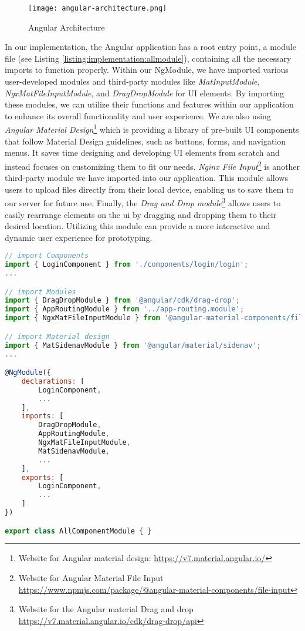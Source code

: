 \begin{figure}[ht]
    \centering
    \texttt{[image: angular-architecture.png]}
    \caption[Angular Architecture]{Angular Architecture}
    \label{implementation:fig:angulararchitecture}
\end{figure}

In our implementation, the Angular application has a root entry point, a module file (see Listing \ref{listing:implementation:allmodule}), containing all the necessary imports to function properly. 
Within our NgModule, we have imported various user-developed modules and third-party modules like \textit{MatInputModule}, \textit{NgxMatFileInputModule}, and \textit{DragDropModule} for UI elements. 
By importing these modules, we can utilize their functions and features within our application to enhance its overall functionality and user experience.
We are also using \textit{Angular Material Design}\footnote{Website for Angular material design: \url{https://v7.material.angular.io/}} which is providing a library of pre-built UI components that follow Material Design guidelines, such as buttons, forms, and navigation menus. 
It saves time designing and developing UI elements from scratch and instead focuses on customizing them to fit our needs.
\textit{Nginx File Input}\footnote{Website for Angular Material File Input \url{https://www.npmjs.com/package/@angular-material-components/file-input}} is another third-party module we have imported into our application. 
This module allows users to upload files directly from their local device, enabling us to save them to our server for future use.
Finally, the \textit{Drag and Drop module}\footnote{Website for the Angular material Drag and drop \url{https://v7.material.angular.io/cdk/drag-drop/api}} allows users to easily rearrange elements on the \ac{ui} by dragging and dropping them to their desired location. 
Utilizing this module can provide a more interactive and dynamic user experience for prototyping.

\begin{lstlisting}[language=JavaScript, caption=The File Defining All the Modules, label=listing:implementation:allmodule]
// import Components
import { LoginComponent } from './components/login/login';
...

// import Modules
import { DragDropModule } from '@angular/cdk/drag-drop';
import { AppRoutingModule } from '../app-routing.module';
import { NgxMatFileInputModule } from '@angular-material-components/file-input';

// import Material design
import { MatSidenavModule } from '@angular/material/sidenav';
...

@NgModule({
    declarations: [
        LoginComponent,
        ...
    ],
    imports: [
        DragDropModule,
        AppRoutingModule,
        NgxMatFileInputModule,
        MatSidenavModule,
        ...
    ],
    exports: [
        LoginComponent, 
        ...
    ]
})

export class AllComponentModule { }
\end{lstlisting}

